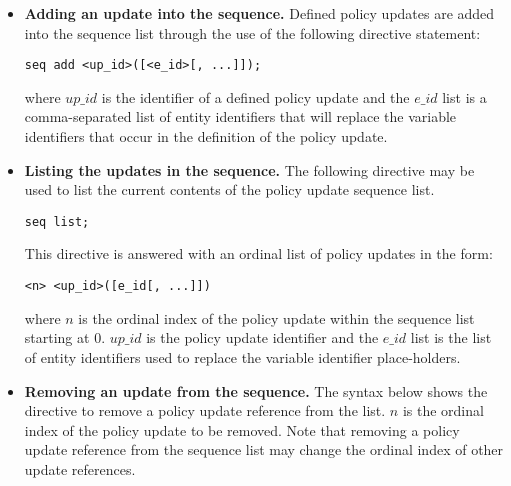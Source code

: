 \documentclass[11pt]{llncs}
\begin{document}
        \begin{itemize}
          \item
            {\bf Adding an update into the sequence.} Defined policy updates
            are added into the sequence list through the use of the following
            directive statement:

            \begin{verbatim}seq add <up_id>([<e_id>[, ...]]);\end{verbatim}
                                                                              
            \noindent where $up\_id$ is the identifier of a defined policy
            update and the $e\_id$ list is a comma-separated list of entity
            identifiers that will replace the variable identifiers that occur
            in the definition of the policy update.

          \vspace{1mm}
          \item
            {\bf Listing the updates in the sequence.} The following
            directive may be used to list the current contents of the policy
            update sequence list.
                                                                              
            \begin{verbatim}seq list;\end{verbatim}
                                                                              
            This directive is answered with an ordinal list of policy
            updates in the form:
                                                                              
            \begin{verbatim}<n> <up_id>([e_id[, ...]])\end{verbatim}

            \noindent where $n$ is the ordinal index of the policy update
            within the sequence list starting at 0. $up\_id$ is the policy
            update identifier and the $e\_id$ list is the list of entity
            identifiers used to replace the variable identifier
            place-holders.

          \vspace{1mm}
          \item
            {\bf Removing an update from the sequence.} The syntax below
            shows the directive to remove a policy update reference from the
            list. $n$ is the ordinal index of the policy update to be
            removed. Note that removing a policy update reference from the
            sequence list may change the ordinal index of other update
            references.
                                                                

\end{itemize}
\end{document}
